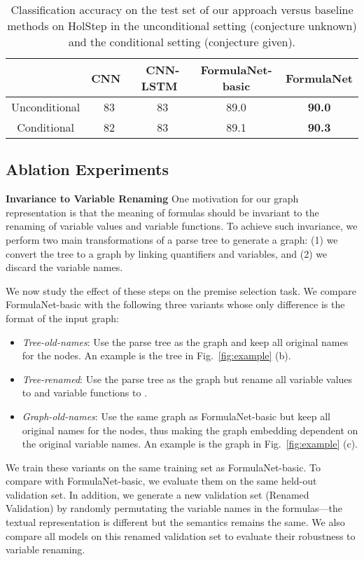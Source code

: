 \documentclass{article}
\begin{document}
\begin{table}[t]
\caption{Classification accuracy on the test set of our approach versus baseline methods on HolStep in the unconditional setting
          (conjecture unknown) and the
          conditional setting (conjecture given). }
	\centering
	\begin{tabular}{c c c c c }\hline
	& CNN~\cite{holstep} & CNN-LSTM~\cite{holstep}  &FormulaNet-basic& FormulaNet \\ \hline
	Unconditional & 83 & 83 &  89.0 & \textbf{90.0} \\ 
	Conditional     & 82 & 83 &  89.1 & \textbf{90.3} \\ \hline
	\end{tabular}
    \label{tab:test}
    \vspace{-4mm}
\end{table}

\subsection{Ablation Experiments}

\noindent \textbf{Invariance to Variable Renaming} One motivation for our graph representation is that the meaning of formulas should be invariant to
the renaming of variable values and variable functions. To achieve such invariance, we perform
two main transformations of a parse tree to generate a graph: (1) we convert
the tree to a graph by linking quantifiers and variables, and (2) we discard the variable names.

We now study the effect of these steps on the premise selection task. 
We compare FormulaNet-basic with the following three variants whose only difference is the
 format of the input graph: 
\begin{itemize} 
	\item \emph{Tree-old-names}: Use the parse tree as the graph and keep all original 
          names for the nodes. An example is the tree in Fig.~\ref{fig:example} (b). 
	\item \emph{Tree-renamed}:  Use the parse tree as the graph but rename all 
          variable values to  and variable functions to .
	\item \emph{Graph-old-names}: Use the same graph as FormulaNet-basic but keep all
          original names for the nodes, thus making the graph embedding dependent on the original
          variable names. An example is the graph in Fig.~\ref{fig:example} (c). 
\end{itemize}
We train these variants on the same training set as FormulaNet-basic. To compare with
FormulaNet-basic, we evaluate them on the same held-out validation set. In addition, we generate
a new validation set (Renamed Validation) by randomly permutating the variable names in
the formulas---the textual representation is different but the semantics remains the
same. We also compare all models on this renamed validation set to evaluate their
robustness to variable renaming.
\end{document}
